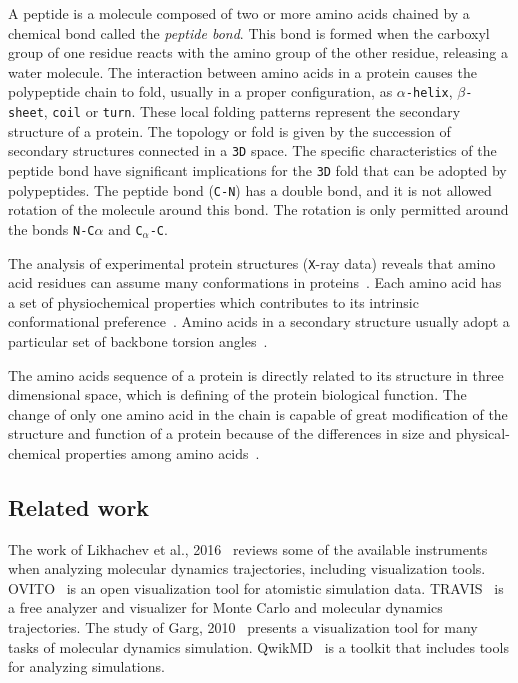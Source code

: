 \documentclass[10pt, conference]{IEEEtran}
\begin{document}
A peptide is a molecule composed of two or more amino acids chained by a chemical bond called the \textit{peptide bond}. This bond is formed when the carboxyl group of one residue reacts with the amino group of the other residue, releasing a water molecule. The interaction between amino acids in a protein causes the polypeptide chain to fold, usually in a proper configuration, as \texttt{$\alpha$-helix}, \texttt{$\beta$-sheet}, \texttt{coil} or \texttt{turn}. These local folding patterns represent the secondary structure of a protein. The topology or fold is given by the succession of secondary structures connected in a \texttt{3D} space. The specific characteristics of the peptide bond have significant implications for the \texttt{3D} fold that can be adopted by polypeptides. The peptide bond (\texttt{C-N}) has a double bond, and it is not allowed rotation of the molecule around this bond. The rotation is only permitted around the bonds \texttt{N-C$\alpha$} and \texttt{C}$_{\alpha}$\texttt{-C}. 

The analysis of experimental protein structures (\texttt{X}-ray data) reveals that amino acid residues can assume many conformations in proteins~\cite{Borguesan:2015}. Each amino acid has a set of physiochemical properties which contributes to its intrinsic conformational preference~\cite{Mathura:2005}. Amino acids in a secondary structure usually adopt a particular set of backbone torsion angles~\cite{Borguesan:2015}.

The amino acids sequence of a protein is directly related to its structure in three dimensional space, which is defining of the protein biological function. The change of only one amino acid in the chain is capable of great modification of the structure and function of a protein because of the differences in size and physical-chemical properties among amino acids~\cite{nelson2008lehninger}.

\subsection{Related work}
%
The work of Likhachev et al., 2016~\cite{likhachev2016available} reviews some of the available instruments when analyzing molecular dynamics trajectories, including visualization tools. OVITO~\cite{stukowski2009visualization} is an open visualization tool for atomistic simulation data. TRAVIS~\cite{brehm2012travis} is a free analyzer and visualizer for Monte Carlo and molecular dynamics trajectories. The study of Garg, 2010~\cite{garg2010visualization} presents a visualization tool for many tasks of molecular dynamics simulation. QwikMD~\cite{ribeiro2016qwikmd} is a toolkit that includes tools for analyzing simulations.
\end{document}
